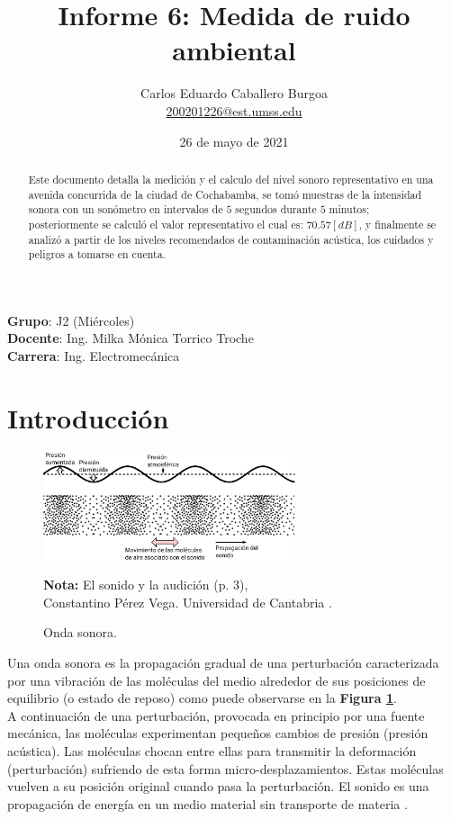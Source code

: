 \documentclass[letter,11pt]{article}
\title{Informe 6: Medida de ruido ambiental}
\author{Carlos Eduardo Caballero Burgoa \\
    \small{\href{mailto:200201226@est.umss.edu}{200201226@est.umss.edu}}
}
\date{26 de mayo de 2021}
\newcommand{\source}[1]{\vspace{-11pt} \caption*{\small{\textbf{Nota:} {#1}}}}
\begin{document}
\maketitle
\begin{center}
    \textbf{Grupo}: J2 (Miércoles)\\
    \textbf{Docente}: Ing. Milka Mónica Torrico Troche\\
    \textbf{Carrera}: Ing. Electromecánica
\end{center}

\begin{abstract}
Este documento detalla la medición y el calculo del nivel sonoro representativo
en una avenida concurrida de la ciudad de Cochabamba, se tomó muestras de la
intensidad sonora con un sonómetro en intervalos de $5$ segundos durante $5$
minutos; posteriormente se calculó el valor representativo el cual es:
$70.57 [dB]$, y finalmente se analizó a partir de los niveles recomendados de
contaminación acústica, los cuidados y peligros a tomarse en cuenta.
\end{abstract}

\section{Introducción}

\begin{figure}
\centering
\includegraphics[width=0.66\textwidth]{resources/f1.eps}
\caption{Onda sonora.}
\label{figura1}
\source{El sonido y la audición (p. 3), \\
Constantino Pérez Vega. Universidad de Cantabria \cite{PEREZ}.}
\end{figure}

Una onda sonora es la propagación gradual de una perturbación caracterizada por
una vibración de las moléculas del medio alrededor de sus posiciones de
equilibrio (o estado de reposo) como puede observarse en la
\textbf{Figura \ref{figura1}}.
\\

A continuación de una perturbación, provocada en principio por una fuente
mecánica, las moléculas experimentan pequeños cambios de presión (presión
acústica). Las moléculas chocan entre ellas para transmitir la deformación
(perturbación) sufriendo de esta forma micro-desplazamientos. Estas moléculas
vuelven a su posición original cuando pasa la perturbación. El sonido es una
propagación de energía en un medio material sin transporte de materia
\cite{COCHLEA}.
\\
\end{document}
